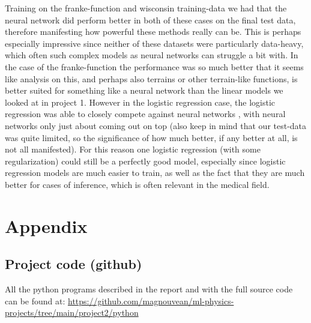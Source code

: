 \documentclass{article}
\begin{document}
Training on the franke-function and wisconsin training-data we had that the
neural network did perform better in both of these cases on the final test data,
therefore manifesting how powerful these methods really can be. This is perhaps
especially impressive since neither of these datasets were particularly
data-heavy, which often such complex models as neural networks can struggle a
bit with. In the case of the franke-function the performance was so much better
that it seems like analysis on this, and perhaps also terrains or other
terrain-like functions, is better suited for something like a neural network
than the linear models we looked at in project 1. However in the logistic
regression case, the logistic regression was able to closely compete against
neural networks , with neural networks only just about coming out on top (also
keep in mind that our test-data was quite limited, so the significance of how
much better, if any better at all, is not all manifested). For this reason one
logistic regression (with some regularization) could still be a perfectly good
model, especially since logistic regression models are much easier to train, as
well as the fact that they are much better for cases of inference, which is
often relevant in the medical field.

\section{Appendix}

\subsection{Project code (github)}
All the python programs described in the report and with the full source code can be
found at:
\url{https://github.com/magnouvean/ml-physics-projects/tree/main/project2/python}


\end{document}
